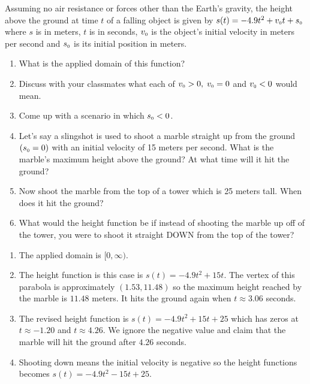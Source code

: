 {Assuming no air resistance or forces other than the Earth's gravity, the height above the ground at time $t$ of a falling object is given by $s(t) = -4.9t^{2} + v_{\mbox{\tiny $0$}}t + s_{\mbox{\tiny $0$}}$ where $s$ is in meters, $t$ is in seconds, $v_{\mbox{\tiny $0$}}$ is the object's initial velocity in meters per second and $s_{\mbox{\tiny $0$}}$ is its initial position in meters.  
\label{whatgoesup}

\begin{enumerate}

\item What is the applied domain of this function?
\item Discuss with your classmates what each of $v_{\mbox{\tiny $0$}} > 0, \; v_{\mbox{\tiny $0$}} = 0$ and $v_{\mbox{\tiny $0$}} < 0$ would mean.
\item Come up with a scenario in which $s_{\mbox{\tiny $0$}} < 0$.
\item Let's say a slingshot is used to shoot a marble straight up from the ground $(s_{\mbox{\tiny $0$}} = 0)$ with an initial velocity of 15 meters per second.  What is the marble's maximum height above the ground?  At what time will it hit the ground?
\item Now shoot the marble from the top of a tower which is 25 meters tall.  When does it hit the ground?
\item What would the height function be if instead of shooting the marble up off of the tower, you were to shoot it straight DOWN from the top of the tower?

\end{enumerate}}
{\begin{enumerate}

\item The applied domain is $[0, \infty)$.

\addtocounter{enumii}{2}

\item The height function is this case is $s(t) = -4.9t^{2} + 15t$.  The vertex of this parabola is approximately $(1.53, 11.48)$ so the maximum height reached by the marble is $11.48$ meters.  It hits the ground again when $t \approx 3.06$ seconds.

\item The revised height function is $s(t) = -4.9t^{2} + 15t + 25$ which has zeros at $t \approx -1.20$ and $t \approx 4.26$.  We ignore the negative value and claim that the marble will hit the ground after $4.26$ seconds.

\item Shooting down means the initial velocity is negative so the height functions becomes $s(t) = -4.9t^{2} - 15t + 25$.

\end{enumerate}}